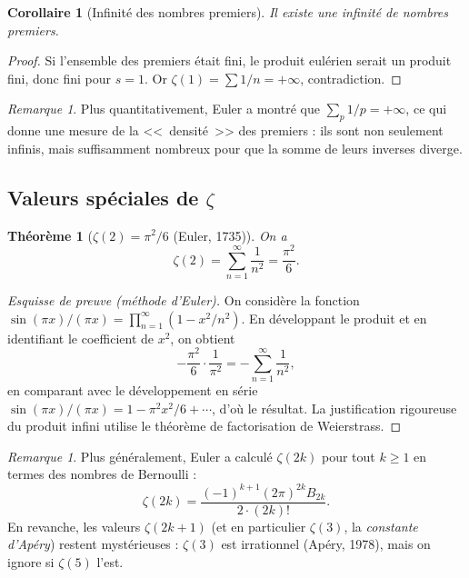 \documentclass[12pt,a4paper,openany]{book}
\theoremstyle{definition}
\theoremstyle{plain}
\newtheorem{theoreme}[definition]{Théorème}
\newtheorem{corollaire}[definition]{Corollaire}
\theoremstyle{remark}
\newtheorem{remarque}[definition]{Remarque}
\begin{document}
\begin{corollaire}[Infinité des nombres premiers]
\label{cor:euler-infinité-premiers}
Il existe une infinité de nombres premiers.
\end{corollaire}

\begin{proof}
Si l'ensemble des premiers était fini, le produit eulérien serait un produit fini,
donc fini pour $s = 1$. Or $\zeta(1) = \sum 1/n = +\infty$, contradiction.
\end{proof}

\begin{remarque}
\label{rem:euler-quantitatif}
Plus quantitativement, Euler a montré que $\sum_{p} 1/p = +\infty$, ce qui
donne une mesure de la <<~densité~>> des premiers : ils sont non seulement
infinis, mais suffisamment nombreux pour que la somme de leurs inverses diverge.
\end{remarque}


\subsection{Valeurs spéciales de $\zeta$}
\label{subsec:valeurs-speciales-zeta}

\begin{theoreme}[{$\zeta(2) = \pi^2/6$} (Euler, 1735)]
\label{thm:zeta-2}
On a
\[
  \zeta(2) = \sum_{n=1}^{\infty} \frac{1}{n^2} = \frac{\pi^2}{6}.
\]
\end{theoreme}

\begin{proof}[Esquisse de preuve (méthode d'Euler)]
On considère la fonction $\sin(\pi x)/(\pi x) = \prod_{n=1}^{\infty}(1 - x^2/n^2)$.
En développant le produit et en identifiant le coefficient de $x^2$, on obtient
\[
  -\frac{\pi^2}{6} \cdot \frac{1}{\pi^2} = - \sum_{n=1}^{\infty} \frac{1}{n^2},
\]
en comparant avec le développement en série $\sin(\pi x)/(\pi x) = 1 - \pi^2 x^2/6 + \cdots$,
d'où le résultat. La justification rigoureuse du produit infini utilise le
théorème de factorisation de Weierstrass.
\end{proof}

\begin{remarque}
\label{rem:zeta-pairs}
Plus généralement, Euler a calculé $\zeta(2k)$ pour tout $k \geq 1$ en termes
des nombres de Bernoulli :
\[
  \zeta(2k) = \frac{(-1)^{k+1} (2\pi)^{2k} B_{2k}}{2 \cdot (2k)!}.
\]
En revanche, les valeurs $\zeta(2k+1)$ (et en particulier $\zeta(3)$, la
\emph{constante d'Apéry}) restent mystérieuses :
$\zeta(3)$ est irrationnel (Apéry, 1978), mais on ignore si $\zeta(5)$ l'est.
\end{remarque}
\end{document}
